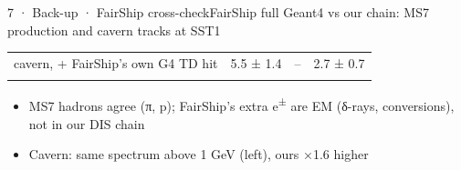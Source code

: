 \begin{btframe}{7 · Back-up · FairShip cross-check}{FairShip full Geant4 vs our chain: MS7 production and cavern tracks at SST1}
\begin{minipage}[t]{\dimexpr(0.53\linewidth-0.53\dimexpr9.67pt\relax)}
{\begin{tabularx}{\linewidth}{>{\raggedright\arraybackslash}Xrrr}
\textcolor{muted}{cavern, + FairShip's own G4 TD hit} & \textcolor{muted}{5.5 ± 1.4} & \textcolor{muted}{–} & \textcolor{muted}{2.7 ± 0.7} \\\rowrule
\end{tabularx}\par}
\vspace{2pt}
\begin{itemize}
  \item MS7 hadrons agree (π, p); FairShip's extra e\textsuperscript{±} are EM (δ-rays, conversions), not in our DIS chain
  \item Cavern: same spectrum above 1 GeV (left), ours ×1.6 higher
\end{itemize}
\end{minipage}\par
\end{btframe}
